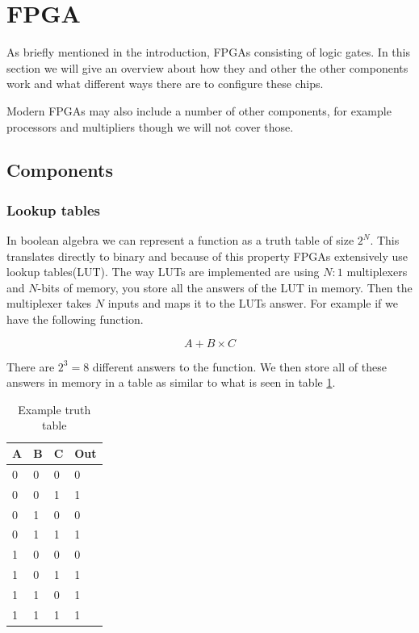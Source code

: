 \documentclass{paper}
\begin{document}
\section{FPGA}
\label{FPGA_introduction}

As briefly mentioned in the introduction, FPGAs consisting of logic gates. In
this section we will give an overview about how they and other the other
components work and what different ways there are to configure these chips.

Modern FPGAs may also include a number of other components, for example
processors and multipliers though we will not cover those.

\subsection{Components}
\subsubsection{Lookup tables}

In boolean algebra we can represent a function as a truth table of size $2^N$.
This translates directly to binary and because of this property FPGAs
extensively use lookup tables(LUT). The way LUTs are implemented are using
$N:1$ multiplexers and $N$-bits of memory, you store all the answers of the LUT
in memory. Then the multiplexer takes $N$ inputs and maps it to the LUTs
answer. For example if we have the following function.

$$A + B \times C$$

There are $2^3 = 8$ different answers to the function. We then
store all of these answers in memory in a table as similar to what is seen in
table \ref{tab:example_truth_table}.

\begin{table}[ht]
    \centering
    \begin{tabular}{|l|l|l|l|}
        \hline
        A & B & C & Out \\ \hline
        0 & 0 & 0 & 0   \\ \hline
        0 & 0 & 1 & 1   \\ \hline
        0 & 1 & 0 & 0   \\ \hline
        0 & 1 & 1 & 1   \\ \hline
        1 & 0 & 0 & 0   \\ \hline
        1 & 0 & 1 & 1   \\ \hline
        1 & 1 & 0 & 1   \\ \hline
        1 & 1 & 1 & 1   \\ \hline
    \end{tabular}
    \caption{Example truth table}
    \label{tab:example_truth_table}
\end{table}
\end{document}
